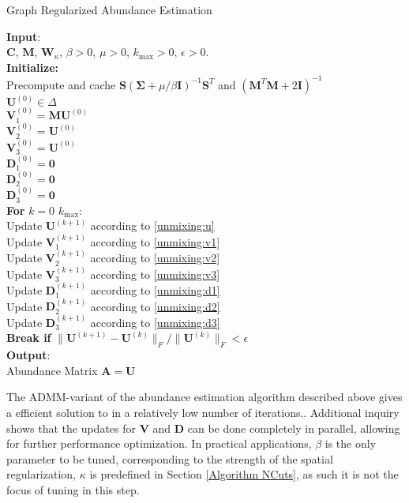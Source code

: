 \begin{algorithm}[H]
  \label{Graph Regularized AE}
  \caption{Graph Regularized Abundance Estimation}
  \textbf{Input}: \\
  \quad  $\mathbf{C}$, $\mathbf{M}$, $\mathbf{W}_{\kappa}$, $\beta > 0$, $\mu > 0$, $k_{\text{max}} > 0$, $\epsilon > 0$.
  \\
  \textbf{Initialize:} 
  \\
  \quad Precompute and cache $\mathbf{S} (\mathbf{\Sigma} + \mu / \beta \mathbf{I})^{-1} \mathbf{S}^T$ and $(\mathbf{M}^T \mathbf{M} + 2\mathbf{I})^{-1}$\\
  \quad $\mathbf{U}^{(0)}  \in \Delta$ \\
  \quad $\mathbf{V}_1^{(0)} = \mathbf{MU}^{(0)}$ \\
  \quad $\mathbf{V}_2^{(0)} = \mathbf{U}^{(0)}$ \\
  \quad $\mathbf{V}_3^{(0)} = \mathbf{U}^{(0)}$ \\
  \quad $\mathbf{D}_1^{(0)} = \mathbf{0}$ \\
  \quad $\mathbf{D}_2^{(0)} = \mathbf{0}$ \\
  \quad $\mathbf{D}_3^{(0)} = \mathbf{0}$
  \\
  \textbf{For} $k = 0$  $k_{\text{max}}$:\\
  \quad Update $\mathbf{U}^{(k+1)}$ according to \eqref{unmixing:u} \\
  \quad Update $\mathbf{V}_1^{(k+1)}$ according to \eqref{unmixing:v1} \\
  \quad Update $\mathbf{V}_2^{(k+1)}$ according to \eqref{unmixing:v2} \\
  \quad Update $\mathbf{V}_3^{(k+1)}$ according to \eqref{unmixing:v3} \\
  \quad Update $\mathbf{D}_1^{(k+1)}$ according to \eqref{unmixing:d1} \\
  \quad Update $\mathbf{D}_2^{(k+1)}$ according to \eqref{unmixing:d2} \\
  \quad Update $\mathbf{D}_3^{(k+1)}$ according to \eqref{unmixing:d3} \\
  \quad \textbf{Break if } $ \|\mathbf{U}^{(k+1)} - \mathbf{U}^{(k)}\|_F/\|\mathbf{U}^{(k)}\|_F < \epsilon$ \\
  \textbf{Output}:\\
  \quad Abundance Matrix $\mathbf{A} = \mathbf{U}$
\end{algorithm}

The ADMM-variant of the abundance estimation algorithm described above gives a efficient solution to in a relatively low number of iterations.. Additional inquiry shows that the updates for $\mathbf{V}$ and $\mathbf{D}$ can be done completely in parallel, allowing for further performance optimization. In practical applications, $\beta$ is the only parameter to be tuned, corresponding to the strength of the spatial regularization, $\kappa$ is predefined in Section \ref{Algorithm NCuts}, as such it is not the focus of tuning in this step. 
